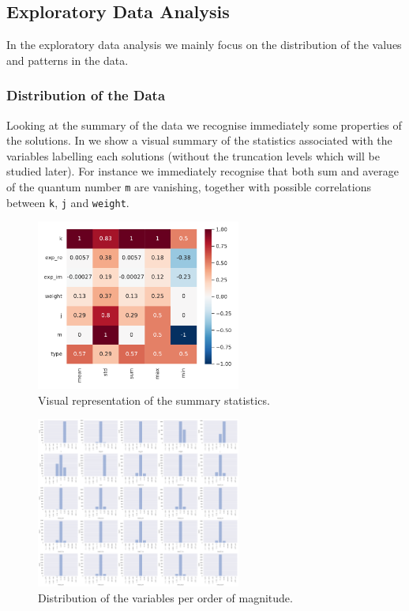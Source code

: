 \subsection{Exploratory Data Analysis}

In the exploratory data analysis we mainly focus on the distribution of the values and patterns in the data.


\subsubsection{Distribution of the Data}

Looking at the summary of the data we recognise immediately some properties of the solutions.
In  we show a visual summary of the statistics associated with the variables labelling each solutions (without the truncation levels which will be studied later).
For instance we immediately recognise that both sum and average of the quantum number \texttt{m} are vanishing, together with possible correlations between \texttt{k}, \texttt{j} and \texttt{weight}.\footnotemark{}

\begin{figure}[htbp]
  \centering
  \includegraphics[width=0.6\textwidth]{img/oth_nodup_summary_norm}
  \caption{Visual representation of the summary statistics.}
  \label{fig:wzw:summary}
\end{figure}

\begin{figure}[htbp]
  \centering
  \includegraphics[width=0.6\textwidth]{img/var_counts}
  \caption{Distribution of the variables per order of magnitude.}
  \label{fig:wzw:counts}
\end{figure}


